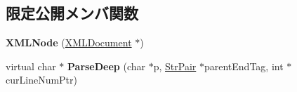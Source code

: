 \subsection*{限定公開メンバ関数}
\begin{DoxyCompactItemize}
\item 
\mbox{\label{classtinyxml2_1_1_x_m_l_node_a29868df6ca383d574f584dfdd15105b6}} 
{\bfseries X\+M\+L\+Node} (\hyperlink{classtinyxml2_1_1_x_m_l_document}{X\+M\+L\+Document} $\ast$)
\item 
\mbox{\label{classtinyxml2_1_1_x_m_l_node_a916e498914baecbc9a1f012352ef7c69}} 
virtual char $\ast$ {\bfseries Parse\+Deep} (char $\ast$p, \hyperlink{classtinyxml2_1_1_str_pair}{Str\+Pair} $\ast$parent\+End\+Tag, int $\ast$cur\+Line\+Num\+Ptr)
\end{DoxyCompactItemize}

